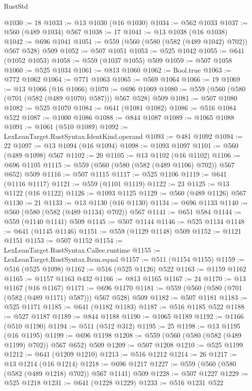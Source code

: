 \begin{lexlean}{RustStd}
\begin{coremodule}
@1030 := 18
@1033 := @13 @1030 (@16 @1030)
@1034 := @562 @1033
@1037 := @560 (@489 @1034) @567
@1038 := 17
@1041 := @13 @1038 (@16 @1038)
@1042 := @696 @1041
@1051 := @559 (@560 (@580 (@582 (@489 @1042) @702)) @567 @528) @509
@1052 := @507 @1051
@1053 := @525 @1042
@1055 := @641 (@1052 @1053)
@1058 := @559 (@1037 @1055) @509
@1059 := @507 @1058
@1060 := @525 @1034
@1061 := @813 @1060
@1062 := Bool.true
@1063 := @772 @1062
@1064 := @771 @1063
@1065 := @569 @1064
@1066 := 19
@1069 := @13 @1066 (@16 @1066)
@1070 := @696 @1069
@1080 := @559 (@560 (@580 (@701 (@582 (@489 @1070) @587))) @567 @528) @509
@1081 := @507 @1080
@1082 := @525 @1070
@1084 := @641 (@1081 @1082)
@1086 := @516 @1084 @522
@1087 := @1000 @1086
@1088 := @844 @1087
@1089 := @1065 @1088
@1091 := @1061 (@510 @1089)
@1092 := LexLeanTarget.RustSyntax.IdentKind.operand
@1093 := @481 @1092
@1094 := 22
@1097 := @13 @1094 (@16 @1094)
@1098 := @1093 @1097
@1101 := @560 (@489 @1098) @567
@1102 := 20
@1105 := @13 @1102 (@16 @1102)
@1106 := @696 @1105
@1115 := @559 (@560 (@580 (@582 (@489 @1106) @702)) @567 @652) @509
@1116 := @507 @1115
@1117 := @525 @1106
@1119 := @641 (@1116 @1117)
@1121 := @559 (@1101 @1119)
@1122 := 23
@1125 := @13 @1122 (@16 @1122)
@1126 := @1093 @1125
@1129 := @560 (@489 @1126) @567
@1130 := 21
@1133 := @13 @1130 (@16 @1130)
@1134 := @696 @1133
@1140 := @560 (@580 (@582 (@489 @1134) @702)) @567
@1141 := @651 @584
@1144 := @559 (@1140 @1141) @509
@1145 := @507 @1144
@1146 := @525 @1134
@1148 := @641 (@1145 @1146)
@1151 := @559 (@1129 @1148) @509
@1152 := @1121 @1151
@1153 := @507 @1152
@1154 := LexLeanTarget.RustSyntax.Callee.runtime
@1155 := LexLeanTarget.RustSyntax.Item.equal
@1157 := @511 (@1154 @1155)
@1159 := @516 (@525 @1098)
@1162 := @516 (@525 @1126) @522
@1163 := @1159 @1162
@1165 := @1157 @1163 @432
@1166 := @813 @1165
@1167 := 24
@1170 := @13 @1167 (@16 @1167)
@1171 := @696 @1170
@1181 := @559 (@560 (@580 (@701 (@582 (@489 @1171) @587))) @567 @528) @509
@1182 := @507 @1181
@1183 := @525 @1171
@1185 := @641 (@1182 @1183)
@1187 := @516 @1185 @522
@1188 := @527 @1187
@1189 := @844 @1188
@1190 := @1065 @1189
@1192 := @1166 (@510 @1190)
@1194 := @511 (@512 @312)
@1195 := 25
@1198 := @13 @1195 (@16 @1195)
@1199 := @696 @1198
@1208 := @559 (@560 (@580 (@582 (@489 @1199) @702)) @567 @652) @509
@1209 := @507 @1208
@1210 := @525 @1199
@1212 := @641 (@1209 @1210)
@1213 := @516 @1212
@1214 := 26
@1217 := @13 @1214 (@16 @1214)
@1218 := @696 @1217
@1227 := @559 (@560 (@580 (@582 (@489 @1218) @702)) @567 @1141) @509
@1228 := @507 @1227
@1229 := @525 @1218
@1231 := @641 (@1228 @1229)
@1233 := @516 @1231 @522

\end{coremodule}
\end{lexlean}
